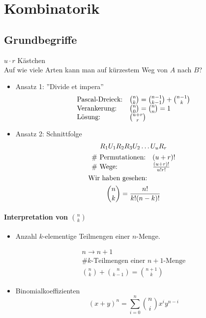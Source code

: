 \chapter{Kombinatorik}
\section{Grundbegriffe}
\begin{bsp*}
	$u \cdot r$ Kästchen\\
	Auf wie viele Arten kann man auf kürzestem Weg von $A$ nach $B$?\\
	\begin{itemize}
		\item Ansatz 1: ''Divide et impera''
		\begin{gather*}
			\begin{array}{ l l }
				\text{Pascal-Dreieck:}		& \binom{n}{k} = \binom{n-1}{k-1} + \binom{n-1}{k}	\\
				\text{Verankerung:}		& \binom{n}{0} = \binom{n}{n} = 1					\\
				\text{Lösung:}			& \binom{u+r}{r}								
			\end{array}
		\end{gather*}
		\item Ansatz 2: Schnittfolge
		\begin{gather*}
			R_1 U_1 R_2 R_3 U_2 \dots U_u R_r \\
			\begin{array}{ l l }
				\text{\# Permutationen:}	& (u+r)!			\\
				\text{\# Wege:}			& \frac{(u+r)!}{u!r!}	
			\end{array}\\
			\intertext{Wir haben gesehen:}
			\binom{n}{k} = \frac{n!}{k!(n-k)!}
		\end{gather*}
	\end{itemize}
\end{bsp*}

\subsubsection{Interpretation von \texorpdfstring{$\binom{n}{k}$}{n tief k}}
\begin{itemize}
	\item Anzahl $k$-elementige Teilmengen einer $n$-Menge. \\
		\begin{bew}[note = {Direkter Beweis: Induktion über $n$}]
			\begin{gather*}
				n \rightarrow n+1 \\
				\# k\text{-Teilmengen einer } n+1\text{-Menge} \\
				\binom{n}{k} + \binom{n}{k-1} = \binom{n+1}{k}
			\end{gather*}
		\end{bew}
	\item Binomialkoeffizienten\\
		\[ (x+y)^n = \sum_{i=0}^n \binom{n}{i} x^i y^{n-i} \]
\end{itemize}

